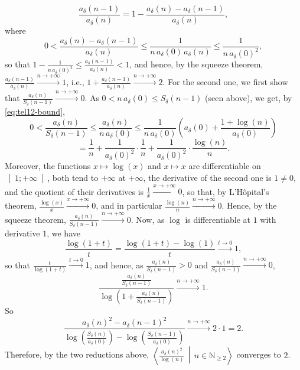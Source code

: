 \begin{solution}
    \[
        \frac{a_\delta\left(n-1\right)}{a_\delta\left(n\right)} = 1-\frac{a_\delta\left(n\right)-a_\delta\left(n-1\right)}{a_\delta\left(n\right)},
    \]
    where
    \[
        0 < \frac{a_\delta\left(n\right)-a_\delta\left(n-1\right)}{a_\delta\left(n\right)} \leq \frac{1}{n\,a_\delta\left(0\right)\,a_\delta\left(n\right)} \leq \frac{1}{n\,a_\delta\left(0\right)^2},
    \]
    so that \( 1-\frac{1}{n\,a_\delta\left(0\right)^2} \leq \frac{a_\delta\left(n-1\right)}{a_\delta\left(n\right)} < 1 \), and hence, by the squeeze theorem, \( \frac{a_\delta\left(n-1\right)}{a_\delta\left(n\right)} \overset{n \to +\infty}{\longrightarrow} 1 \), i.e., \( 1+\frac{a_\delta\left(n-1\right)}{a_\delta\left(n\right)} \overset{n \to +\infty}{\longrightarrow} 2 \). For the second one, we first show that \( \frac{a_\delta\left(n\right)}{S_\delta\left(n-1\right)} \overset{n \to +\infty}{\longrightarrow} 0 \). As \( 0 < n\,a_\delta\left(0\right) \leq S_\delta\left(n-1\right) \) (seen above), we get, by \eqref{eq:tel12-bound},
    \[
        0 < \frac{a_\delta\left(n\right)}{S_\delta\left(n-1\right)} \leq \frac{a_\delta\left(n\right)}{n\,a_\delta\left(0\right)} \leq \frac{1}{n\,a_\delta\left(0\right)}\left(a_\delta\left(0\right)+\frac{1+\log\left(n\right)}{a_\delta\left(0\right)}\right)
    \]
    \[
        = \frac{1}{n}+\frac{1}{a_\delta\left(0\right)^2} \cdot \frac{1}{n}+\frac{1}{a_\delta\left(0\right)^2} \cdot \frac{\log\left(n\right)}{n}.
    \]
    Moreover, the functions \( x \mapsto \log\left(x\right) \) and \( x \mapsto x \) are differentiable on \( \left]1;+\infty\right[ \), both tend to \( +\infty \) at \( +\infty \), the derivative of the second one is \( 1 \neq 0 \), and the quotient of their derivatives is \( \frac{1}{x} \overset{x \to +\infty}{\longrightarrow} 0 \), so that, by L'Hôpital's theorem, \( \frac{\log\left(x\right)}{x} \overset{x \to +\infty}{\longrightarrow} 0 \), and in particular \( \frac{\log\left(n\right)}{n} \overset{n \to +\infty}{\longrightarrow} 0 \). Hence, by the squeeze theorem, \( \frac{a_\delta\left(n\right)}{S_\delta\left(n-1\right)} \overset{n \to +\infty}{\longrightarrow} 0 \). Now, as \( \log \) is differentiable at \( 1 \) with derivative \( 1 \), we have
    \[
        \frac{\log\left(1+t\right)}{t} = \frac{\log\left(1+t\right)-\log\left(1\right)}{t} \overset{t \to 0}{\longrightarrow} 1,
    \]
    so that \( \frac{t}{\log\left(1+t\right)} \overset{t \to 0}{\longrightarrow} 1 \), and hence, as \( \frac{a_\delta\left(n\right)}{S_\delta\left(n-1\right)} > 0 \) and \( \frac{a_\delta\left(n\right)}{S_\delta\left(n-1\right)} \overset{n \to +\infty}{\longrightarrow} 0 \),
    \[
        \frac{\frac{a_\delta\left(n\right)}{S_\delta\left(n-1\right)}}{\log\left(1+\frac{a_\delta\left(n\right)}{S_\delta\left(n-1\right)}\right)} \overset{n \to +\infty}{\longrightarrow} 1.
    \]
    So
    \[
        \frac{a_\delta\left(n\right)^2-a_\delta\left(n-1\right)^2}{\log\left(\frac{S_\delta\left(n\right)}{a_\delta\left(0\right)}\right)-\log\left(\frac{S_\delta\left(n-1\right)}{a_\delta\left(0\right)}\right)} \overset{n \to +\infty}{\longrightarrow} 2 \cdot 1 = 2.
    \]
    Therefore, by the two reductions above, \( \left\langle \frac{a_\delta\left(n\right)^2}{\log\left(n\right)} \,\middle|\, n \in \mathbb{N}_{\geq 2} \right\rangle \) converges to \( 2 \).
\end{solution}
